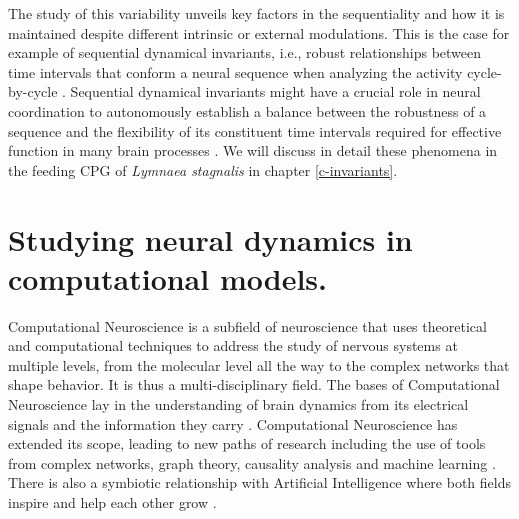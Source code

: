 The study of this variability unveils key factors in the sequentiality and how it is maintained despite different intrinsic or external modulations. This is the case for example of sequential dynamical invariants, i.e., robust relationships between time intervals that conform a neural sequence when analyzing the activity cycle-by-cycle \parencite{reyes_artificial_2008,elices_robust_2019,garrido-pena_characterization_2021,berbel_emergence_2024}. Sequential dynamical invariants might have a crucial role in neural coordination to autonomously establish a balance between the robustness of a sequence and the flexibility of its constituent time intervals required for effective function in many brain processes \parencite{tatsuno_analysis_2015,ullen_neural_2003,zimnik_independent_2021,zhou_neural_2020,dragoi_cell_2020}. We will discuss in detail these phenomena in the feeding CPG of \textit{Lymnaea stagnalis} in chapter \ref{c-invariants}.


\section{Studying neural dynamics in computational models.}
\label{sec:computational neuroscience}
Computational Neuroscience is a subfield of neuroscience that uses theoretical and computational techniques to address the study of nervous systems at multiple levels, from the molecular level all the way to the complex networks that shape behavior. It is thus a multi-disciplinary field. The bases of Computational Neuroscience lay in the understanding of brain dynamics from its electrical signals and the information they carry \parencite{hodgkin_quantitative_1952,schwiening_brief_2012,catterall_hodgkinhuxley_2012,dimitrov_information_2011,shannon_mathematical_1948}. Computational Neuroscience has extended its scope, leading to new paths of research including the use of tools from complex networks, graph theory, causality analysis and machine learning \parencite{_30th_2021}. There is also a symbiotic relationship with Artificial Intelligence where both fields inspire and help each other grow \parencite{amunts_human_2019,wozniak_deep_2020,goncalves_training_2020}.

